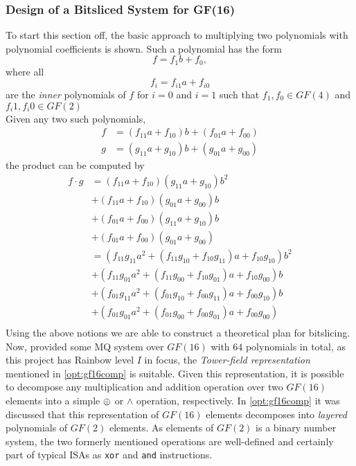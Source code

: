 \subsubsection{Design of a Bitsliced System for GF(16)} \label{bitslice:theory}
To start this section off, the basic approach to multiplying two polynomials with polynomial coefficients is shown. Such a polynomial has the form
$$
    f = f_1b + f_0,
$$
where all
$$
    f_i = f_{i1}a+f_{i0}
$$
are the \emph{inner} polynomials of $f$ for $i = 0$ and $i = 1$ such that $f_1, f_0 \in GF(4)$ and $f_i1, f_i0 \in GF(2)$\\ 
Given any two such polynomials,
\begin{equation*}
    \begin{split}
        f &= (f_{11}a+f_{10})b + (f_{01}a + f_{00})\\
        g &= (g_{11}a+g_{10})b + (g_{01}a + g_{00})
    \end{split}
\end{equation*}
the product can be computed by
\begin{equation} \label{bitslice:poly}
    \begin{split}
        f \cdot g &= (f_{11}a + f_{10})(g_{11}a + g_{10})b^2\\
        &+ (f_{11} a + f_{10})(g_{01}a + g_{00})b\\ 
        &+ (f_{01}a + f_{00})(g_{11}a + g_{10})b\\ 
        &+ (f_{01} a + f_{00})(g_{01}a + g_{00})\\
        &= (f_{11}g_{11}a^2 + (f_{11}g_{10} + f_{10}g_{11})a + f_{10}g_{10})b^2\\
        &+ (f_{11}g_{01}a^2 + (f_{11}g_{00} + f_{10}g_{01})a + f_{10}g_{00})b\\
        &+ (f_{01}g_{11}a^2 + (f_{01}g_{10} + f_{00}g_{11})a + f_{00}g_{10})b\\
        &+ (f_{01}g_{01}a^2 + (f_{01}g_{00} + f_{00}g_{01})a + f_{00}g_{00})\\
    \end{split}
\end{equation}
Using the above notions we are able to construct a theoretical plan for bitslicing.
\medskip\\
Now, provided some MQ system over $GF(16)$ with $64$ polynomials in total, as this project has Rainbow level $I$ in focus, the \emph{Tower-field representation} mentioned in \cref{opt:gf16comp} is suitable. Given this representation, it is possible to decompose any multiplication and addition operation over two $GF(16)$ elements into a simple $\oplus$ or $\wedge$ operation, respectively. In \cref{opt:gf16comp} it was discussed that this representation of $GF(16)$ elements decomposes into \emph{layered} polynomials of $GF(2)$ elements. As elements of $GF(2)$ is a binary number system, the two formerly mentioned operations are well-defined and certainly part of typical ISAs as \texttt{xor} and \texttt{and} instructions.\medskip\\
